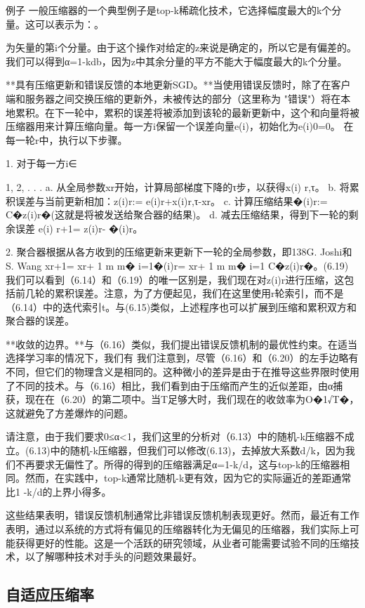 例子 一般压缩器的一个典型例子是top-k稀疏化技术，它选择幅度最大的k个分量。这可以表示为：。

为矢量的第i个分量。由于这个操作对给定的z来说是确定的，所以它是有偏差的。我们可以得到α=1-kdb，因为z中其余分量的平方不能大于幅度最大的k个分量。

**具有压缩更新和错误反馈的本地更新SGD。**当使用错误反馈时，除了在客户端和服务器之间交换压缩的更新外，未被传达的部分（这里称为 "错误"）将在本地累积。在下一轮中，累积的误差将被添加到该轮的最新更新中，这个和向量将被压缩器用来计算压缩向量。每一方i保留一个误差向量e(i)，初始化为e(i)0=0。 在每一轮r中，执行以下步骤。

1. 对于每一方i∈{1, 2, . . . a. 从全局参数xr开始，计算局部梯度下降的τ步，以获得x(i) r,τ。
	b. 将累积误差与当前更新相加：z(i)r:= e(i)r+x(i)r,τ-xr。
	c. 计算压缩结果�(i)r:= C�z(i)r�(这就是将被发送给聚合器的结果)。
	d. 减去压缩结果，得到下一轮的剩余误差 e(i) r+1= z(i)r- �(i)r。
	
	2. 聚合器根据从各方收到的压缩更新来更新下一轮的全局参数，即138G. Joshi和S. Wang xr+1= xr+ 1 m m� i=1�(i)r= xr+ 1 m m� i=1 C�z(i)r�。(6.19) 我们可以看到（6.14）和（6.19）的唯一区别是，我们现在对z(i)r进行压缩，这包括前几轮的累积误差。注意，为了方便起见，我们在这里使用r轮索引，而不是（6.14）中的迭代索引t。与(6.15)类似，上述程序也可以扩展到压缩和累积双方和聚合器的误差。
	
	**收敛的边界。**与（6.16）类似，我们提出错误反馈机制的最优性约束。在适当选择学习率的情况下，我们有
	我们注意到，尽管（6.16）和（6.20）的左手边略有不同，但它们的物理含义是相同的。这种微小的差异是由于在推导这些界限时使用了不同的技术。与（6.16）相比，我们看到由于压缩而产生的近似差距，由α捕获，现在在（6.20）的第二项中。当T足够大时，我们现在的收敛率为O�1√T�，这就避免了方差爆炸的问题。
	
	请注意，由于我们要求0≤α<1，我们这里的分析对（6.13）中的随机-k压缩器不成立。(6.13)中的随机-k压缩器，但我们可以修改(6.13)，去掉放大系数d/k，因为我们不再要求无偏性了。所得的得到的压缩器满足α=1-k/d，这与top-k的压缩器相同。然而，在实践中，top-k通常比随机-k更有效，因为它的实际逼近的差距通常比1 -k/d的上界小得多。
	
	这些结果表明，错误反馈机制通常比非错误反馈机制表现更好。然而，最近有工作表明，通过以系统的方式将有偏见的压缩器转化为无偏见的压缩器，我们实际上可能获得更好的性能。这是一个活跃的研究领域，从业者可能需要试验不同的压缩技术，以了解哪种技术对手头的问题效果最好。
	
\subsection{自适应压缩率}
	
}
